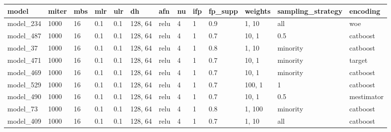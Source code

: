 \begin{tabular}{|l|l|l|l|l|l|l|l|l|l|l|l|l|}
\hline
\textbf{model} & \textbf{miter} & \textbf{mbs} & \textbf{mlr} & \textbf{ulr} & \textbf{dh} & \textbf{afn} & \textbf{nu} & \textbf{ifp} & \textbf{fp\_supp} & \textbf{weights} & \textbf{sampling\_strategy} & \textbf{encoding} \\ \hline
model\_234     & 1000           & 16           & 0.1          & 0.1          & 128, 64     & relu         & 4           & 1            & 0.9               & 1, 10            & all                         & woe               \\ \hline
model\_487     & 1000           & 16           & 0.1          & 0.1          & 128, 64     & relu         & 4           & 1            & 0.7               & 10, 1            & 0.5                         & catboost          \\ \hline
model\_37      & 1000           & 16           & 0.1          & 0.1          & 128, 64     & relu         & 4           & 1            & 0.8               & 1, 10            & minority                    & catboost          \\ \hline
model\_471     & 1000           & 16           & 0.1          & 0.1          & 128, 64     & relu         & 4           & 1            & 0.7               & 10, 1            & minority                    & target            \\ \hline
model\_469     & 1000           & 16           & 0.1          & 0.1          & 128, 64     & relu         & 4           & 1            & 0.7               & 10, 1            & minority                    & catboost          \\ \hline
model\_529     & 1000           & 16           & 0.1          & 0.1          & 128, 64     & relu         & 4           & 1            & 0.7               & 100, 1           & 1                           & catboost          \\ \hline
model\_490     & 1000           & 16           & 0.1          & 0.1          & 128, 64     & relu         & 4           & 1            & 0.7               & 10, 1            & 0.5                         & mestimator        \\ \hline
model\_73      & 1000           & 16           & 0.1          & 0.1          & 128, 64     & relu         & 4           & 1            & 0.8               & 1, 100           & minority                    & catboost          \\ \hline
model\_409     & 1000           & 16           & 0.1          & 0.1          & 128, 64     & relu         & 4           & 1            & 0.7               & 1, 10            & all                         & catboost          \\ \hline

\end{tabular}
